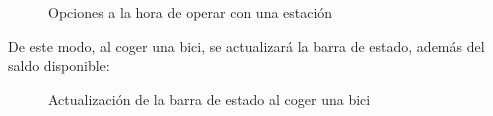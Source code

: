 \begin{figure} [!htb]
	\centering
	\caption{Opciones a la hora de operar con una estación}
	\label{fig:opcionesEstacion}
\end{figure}

De este modo, al coger una bici, se actualizará la barra de estado, además del saldo disponible:

\begin{figure} [!htb]
	\centering
	\caption{Actualización de la barra de estado al coger una bici}
	\label{fig:barraEstadoBiciCogida}
\end{figure}

